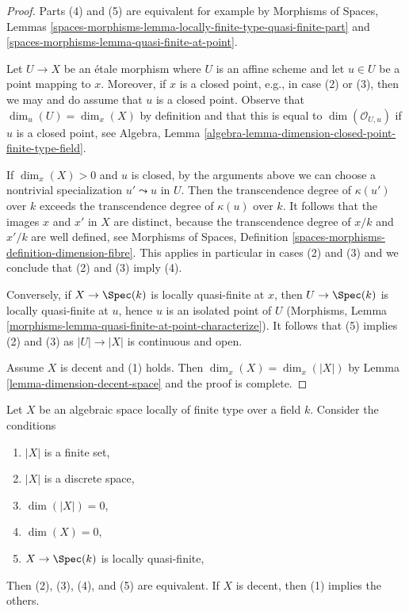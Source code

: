 \begin{proof}
Parts (4) and (5) are equivalent for example by
Morphisms of Spaces, Lemmas
\ref{spaces-morphisms-lemma-locally-finite-type-quasi-finite-part} and
\ref{spaces-morphisms-lemma-quasi-finite-at-point}.

\medskip\noindent
Let $U \to X$ be an \'etale morphism where $U$ is an affine scheme and let
$u \in U$ be a point mapping to $x$. Moreover, if $x$ is a closed
point, e.g., in case (2) or (3), then we may and do assume that $u$
is a closed point. Observe that $\dim_u(U) = \dim_x(X)$ by definition
and that this is equal to $\dim(\mathcal{O}_{U, u})$ if $u$ is a closed
point, see Algebra, Lemma
\ref{algebra-lemma-dimension-closed-point-finite-type-field}.

\medskip\noindent
If $\dim_x(X) > 0$ and $u$ is closed, by the arguments above
we can choose a nontrivial
specialization $u' \leadsto u$ in $U$. Then the transcendence degree
of $\kappa(u')$ over $k$ exceeds the transcendence degree of
$\kappa(u)$ over $k$. It follows that the images $x$ and $x'$ in $X$
are distinct, because the transcendence degree of $x/k$ and $x'/k$
are well defined, see Morphisms of Spaces, Definition
\ref{spaces-morphisms-definition-dimension-fibre}.
This applies in particular in cases (2) and (3) and we
conclude that (2) and (3) imply (4).

\medskip\noindent
Conversely, if $X \to \Spec(k)$ is locally quasi-finite at $x$, then
$U \to \Spec(k)$ is locally quasi-finite at $u$, hence $u$ is an
isolated point of $U$
(Morphisms, Lemma \ref{morphisms-lemma-quasi-finite-at-point-characterize}).
It follows that (5) implies (2) and (3) as
$|U| \to |X|$ is continuous and open.

\medskip\noindent
Assume $X$ is decent and (1) holds. Then $\dim_x(X) = \dim_x(|X|)$
by Lemma \ref{lemma-dimension-decent-space} and the proof is complete.
\end{proof}

\begin{lemma}
\label{lemma-conditions-on-space-over-field}
Let $X$ be an algebraic space locally of finite type over a field $k$.
Consider the conditions
\begin{enumerate}
\item $|X|$ is a finite set,
\item $|X|$ is a discrete space,
\item $\dim(|X|) = 0$,
\item $\dim(X) = 0$,
\item $X \to \Spec(k)$ is locally quasi-finite,
\end{enumerate}
Then (2), (3), (4), and (5) are equivalent.
If $X$ is decent, then (1) implies the others.
\end{lemma}

